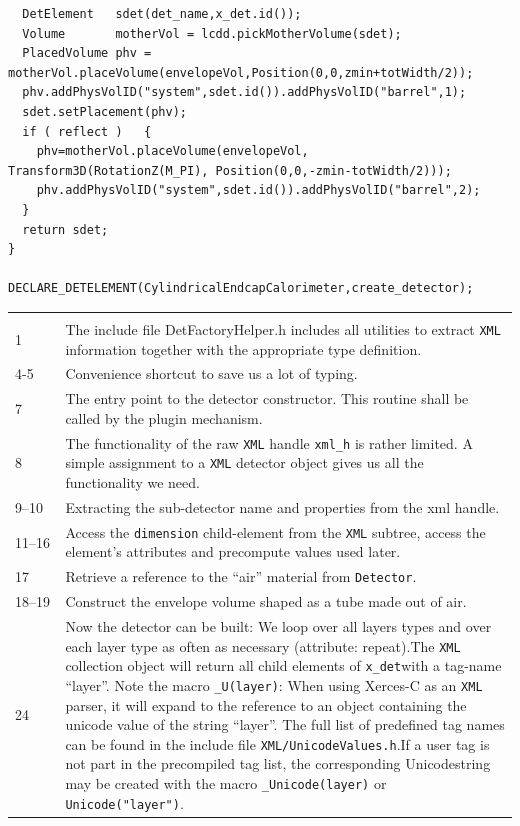 \begin{verbatim}
  DetElement   sdet(det_name,x_det.id());
  Volume       motherVol = lcdd.pickMotherVolume(sdet);
  PlacedVolume phv = motherVol.placeVolume(envelopeVol,Position(0,0,zmin+totWidth/2));
  phv.addPhysVolID("system",sdet.id()).addPhysVolID("barrel",1);
  sdet.setPlacement(phv);
  if ( reflect )   {
    phv=motherVol.placeVolume(envelopeVol, Transform3D(RotationZ(M_PI), Position(0,0,-zmin-totWidth/2)));
    phv.addPhysVolID("system",sdet.id()).addPhysVolID("barrel",2);
  }
  return sdet;
}

DECLARE_DETELEMENT(CylindricalEndcapCalorimeter,create_detector);
\end{verbatim}
{\small
\begin{tabular} {p{0.1\linewidth}|p{0.9\linewidth}}
\hline \\
1 & The include file DetFactoryHelper.h includes all utilities to extract \texttt{XML} information together with the appropriate type definition.\\
4-5 & Convenience shortcut to save us a lot of typing.\\
7 & The entry point to the detector constructor. This routine shall be called by the plugin mechanism.\\
8 & The functionality of the raw \texttt{XML} handle \texttt{xml\_h} is rather limited. A simple assignment to a \texttt{XML} detector object gives us all the functionality we need.\\
9--10 & Extracting the sub-detector name and properties from the xml handle.\\
11--16 & Access the \texttt{dimension} child-element from the \texttt{XML} subtree, access the element's attributes and precompute values used later.\\
17 & Retrieve a reference to the ``air'' material from \texttt{Detector}.\\
18--19 & Construct the envelope volume shaped as a tube made out of air.\\
24 & Now the detector can be built: We loop over all layers types and over each layer type as often as necessary (attribute: repeat).The \texttt{XML} collection object will return all child elements of \texttt{x\_det}with a tag-name ``layer''.  Note the macro \texttt{\_U(layer)}: When using Xerces-C as an \texttt{XML} parser, it will expand to the reference to an object containing the unicode value of the string ``layer''. The full list of predefined tag names can be found in the include file \texttt{XML/UnicodeValues.h}.If a user tag is not part in the precompiled tag list, the corresponding Unicodestring may be created with the macro \texttt{\_Unicode(layer)} or \texttt{Unicode("layer")}.\\

\end{tabular}}
